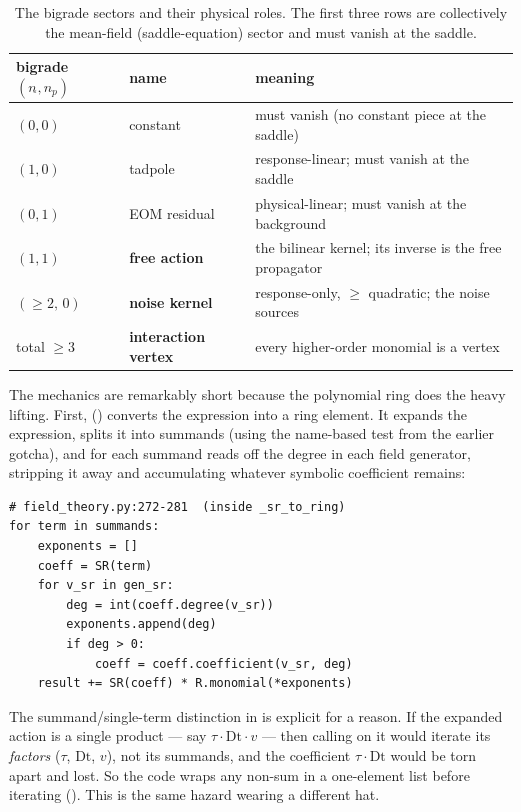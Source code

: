 \begin{table}[h]
\centering
\caption{The bigrade sectors and their physical roles. The first three rows are
collectively the mean-field (saddle-equation) sector and must vanish at the saddle.}
\label{tab:bigrade}
\small
\begin{tabular}{@{}lll@{}}
\toprule
bigrade $(n_{\tilde{}},n_p)$ & name & meaning \\
\midrule
$(0,0)$        & constant      & must vanish (no constant piece at the saddle) \\
$(1,0)$        & tadpole       & response-linear; must vanish at the saddle \\
$(0,1)$        & EOM residual  & physical-linear; must vanish at the background \\
$(1,1)$        & \textbf{free action}   & the bilinear kernel; its inverse is the free propagator \\
$(\ge 2,\,0)$  & \textbf{noise kernel}  & response-only, $\ge$ quadratic; the noise sources \\
total $\ge 3$  & \textbf{interaction vertex} & every higher-order monomial is a vertex \\
\bottomrule
\end{tabular}
\end{table}

The mechanics are remarkably short because the polynomial ring does the heavy
lifting. First,  () converts the
 expression into a ring element. It expands the expression, splits it into
summands (using the name-based  test from the earlier gotcha), and for
each summand reads off the degree in each field generator, stripping it away and
accumulating whatever symbolic coefficient remains:

\begin{lstlisting}
# field_theory.py:272-281  (inside _sr_to_ring)
for term in summands:
    exponents = []
    coeff = SR(term)
    for v_sr in gen_sr:
        deg = int(coeff.degree(v_sr))
        exponents.append(deg)
        if deg > 0:
            coeff = coeff.coefficient(v_sr, deg)
    result += SR(coeff) * R.monomial(*exponents)
\end{lstlisting}

\begin{gotcha}
The summand/single-term distinction in  is explicit for a
reason. If the expanded action is a single product --- say $\tau\cdot\mathrm{Dt}\cdot v$
--- then calling  on it would iterate its \emph{factors}
($\tau$, $\mathrm{Dt}$, $v$), not its summands, and the coefficient $\tau\cdot\mathrm{Dt}$
would be torn apart and lost. So the code wraps any non-sum in a one-element list
\code{[expanded]} before iterating (). This is the
same  hazard wearing a different hat.
\end{gotcha}

